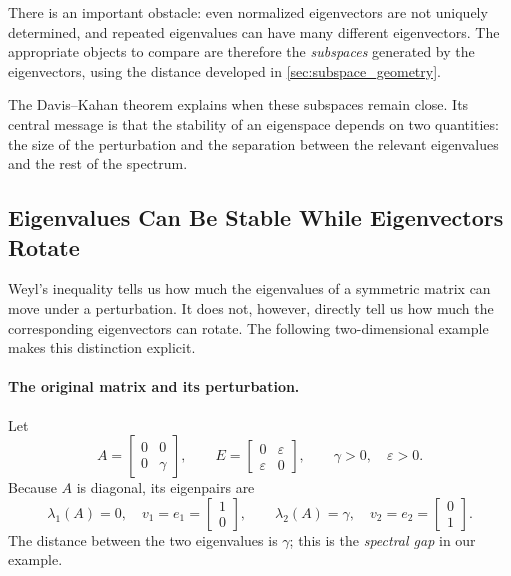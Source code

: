\documentclass[14pt,letterpaper]{article}
\theoremstyle{plain}
\theoremstyle{definition}
\theoremstyle{remark}
\begin{document}
There is an important obstacle: even normalized eigenvectors
are not uniquely determined, and repeated eigenvalues can
have many different eigenvectors. The appropriate objects
to compare are therefore the \emph{subspaces} generated
by the eigenvectors, using the distance developed in
\cref{sec:subspace_geometry}.

The Davis--Kahan theorem explains when these subspaces
remain close. Its central message is that the stability
of an eigenspace depends on two quantities: the size
of the perturbation and the separation between the
relevant eigenvalues and the rest of the spectrum.


\subsection{Eigenvalues Can Be Stable While Eigenvectors Rotate}
\label{subsec:dk_motivation}

Weyl's inequality tells us how much the eigenvalues of a symmetric
matrix can move under a perturbation. It does not, however, directly
tell us how much the corresponding eigenvectors can rotate. The
following two-dimensional example makes this distinction explicit.


\paragraph{The original matrix and its perturbation.}
Let
\[
A=\begin{bmatrix}0&0\\0&\gamma\end{bmatrix},
\qquad
E=\begin{bmatrix}0&\varepsilon\\\varepsilon&0\end{bmatrix},
\qquad \gamma>0,\quad\varepsilon>0.
\]
Because $A$ is diagonal, its eigenpairs are
\[
\lambda_1(A)=0,\quad v_1=e_1=\begin{bmatrix}1\\0\end{bmatrix},
\qquad
\lambda_2(A)=\gamma,\quad v_2=e_2=\begin{bmatrix}0\\1\end{bmatrix}.
\]
The distance between the two eigenvalues is $\gamma$;
this is the \emph{spectral gap} in our example.
\end{document}
